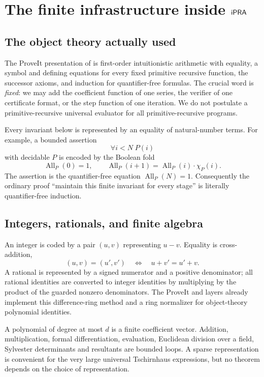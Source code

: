 \section{The finite infrastructure inside \(\mathsf{iPRA}\)}\label{sec:framework}

\subsection{The object theory actually used}

The ProveIt presentation of \ipra{} is first-order intuitionistic arithmetic
with equality, a symbol and defining equations for every fixed primitive
recursive function, the successor axioms, and induction for quantifier-free
formulas.  The crucial word is \emph{fixed}: we may add the coefficient
function of one series, the verifier of one certificate format, or the step
function of one iteration.  We do not postulate a primitive-recursive universal
evaluator for all primitive-recursive programs.

Every invariant below is represented by an equality of natural-number terms.
For example, a bounded assertion
\[
  \forall i<N\; P(i)
\]
with decidable \(P\) is encoded by the Boolean fold
\[
  \operatorname{All}_P(0)=1,
  \qquad
  \operatorname{All}_P(i+1)=
  \operatorname{All}_P(i)\cdot\chi_P(i).
\]
The assertion is the quantifier-free equation
\(\operatorname{All}_P(N)=1\).  Consequently the ordinary proof ``maintain
this finite invariant for every stage'' is literally quantifier-free
induction.

\subsection{Integers, rationals, and finite algebra}

An integer is coded by a pair \((u,v)\) representing \(u-v\).  Equality is
cross-addition,
\[
 (u,v)=(u',v')\quad\Longleftrightarrow\quad u+v'=u'+v.
\]
A rational is represented by a signed numerator and a positive denominator;
all rational identities are converted to integer identities by multiplying by
the product of the guarded nonzero denominators.  The ProveIt
 and  layers already
implement this difference-ring method and a ring normalizer for object-theory
polynomial identities.

A polynomial of degree at most \(d\) is a finite coefficient vector.  Addition,
multiplication, formal differentiation, evaluation, Euclidean division over a
field, Sylvester determinants and resultants are bounded loops.  A sparse
representation is convenient for the very large universal Tschirnhaus
expressions, but no theorem depends on the choice of representation.

